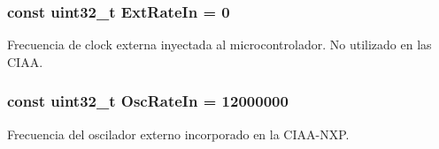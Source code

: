 \subsubsection[{\texorpdfstring{Ext\+Rate\+In}{ExtRateIn}}]{\setlength{\rightskip}{0pt plus 5cm}const uint32\+\_\+t Ext\+Rate\+In = 0}\hypertarget{group__hardware_ga74ceed751e84a920be263a7fe3da67f0}{}\label{group__hardware_ga74ceed751e84a920be263a7fe3da67f0}
Frecuencia de clock externa inyectada al microcontrolador. No utilizado en las C\+I\+AA. 
\subsubsection[{\texorpdfstring{Osc\+Rate\+In}{OscRateIn}}]{\setlength{\rightskip}{0pt plus 5cm}const uint32\+\_\+t Osc\+Rate\+In = 12000000}\hypertarget{group__hardware_ga2e84f0502f9a7fdd271b97c588696e6f}{}\label{group__hardware_ga2e84f0502f9a7fdd271b97c588696e6f}
Frecuencia del oscilador externo incorporado en la C\+I\+A\+A-\/\+N\+XP. 
